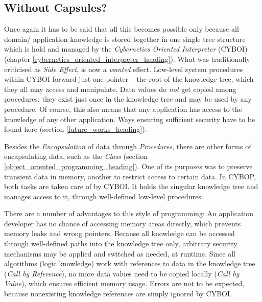 %
%
%
%
%
%
%

\subsection{Without Capsules?}
\label{without_capsules_heading}

Once again it has to be said that all this becomes possible only because all
domain/ application knowledge is stored together in one single tree structure
which is hold and managed by the \emph{Cybernetics Oriented Interpreter}
(CYBOI) (chapter \ref{cybernetics_oriented_interpreter_heading}). What was
traditionally criticised as \emph{Side Effect}, is now a \emph{wanted} effect.
Low-level system procedures within CYBOI forward just one pointer -- the root
of the knowledge tree, which they all may access and manipulate. Data values do
\emph{not} get copied among procedures; they exist just once in the knowledge
tree and may be used by any procedure. Of course, this also means that any
application has access to the knowledge of any other application. Ways ensuring
sufficient security have to be found here (section \ref{future_works_heading}).

Besides the \emph{Encapsulation} of data through \emph{Procedures}, there are
other forms of encapsulating data, such as the \emph{Class} (section
\ref{object_oriented_programming_heading}). One of its purposes was to preserve
transient data in memory, another to restrict access to certain data. In CYBOP,
both tasks are taken care of by CYBOI. It holds the singular knowledge tree and
manages access to it, through well-defined low-level procedures.

There are a number of advantages to this style of programming: An application
developer has no chance of accessing memory areas directly, which prevents
memory leaks and wrong pointers. Because all knowledge can be accessed through
well-defined paths into the knowledge tree only, arbitrary security mechanisms
may be applied and switched as needed, at runtime. Since all algorithms (logic
knowledge) work with references to data in the knowledge tree
(\emph{Call by Reference}), no more data values need to be copied locally
(\emph{Call by Value}), which ensures efficient memory usage. Errors are not to
be expected, because nonexisting knowledge references are simply ignored by
CYBOI.
